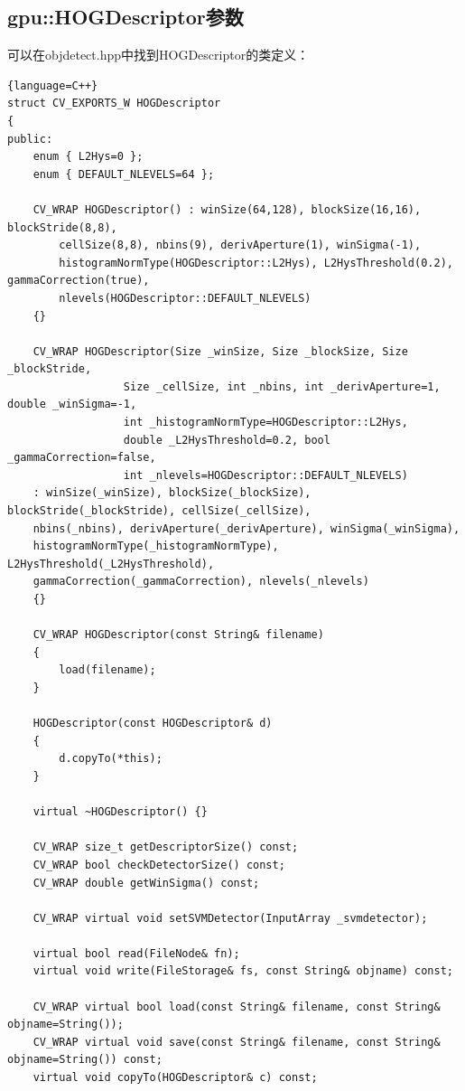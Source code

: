 \documentclass[10pt,technote,onecolumn,twoside]{IEEEtran}
\begin{document}
\subsection{gpu::HOGDescriptor参数}
可以在\textsf{objdetect.hpp}中找到\textsf{HOGDescriptor}的类定义：
\begin{lstlisting}{language=C++}
struct CV_EXPORTS_W HOGDescriptor
{
public:
    enum { L2Hys=0 };
    enum { DEFAULT_NLEVELS=64 };

    CV_WRAP HOGDescriptor() : winSize(64,128), blockSize(16,16), blockStride(8,8),
        cellSize(8,8), nbins(9), derivAperture(1), winSigma(-1),
        histogramNormType(HOGDescriptor::L2Hys), L2HysThreshold(0.2), gammaCorrection(true),
        nlevels(HOGDescriptor::DEFAULT_NLEVELS)
    {}

    CV_WRAP HOGDescriptor(Size _winSize, Size _blockSize, Size _blockStride,
                  Size _cellSize, int _nbins, int _derivAperture=1, double _winSigma=-1,
                  int _histogramNormType=HOGDescriptor::L2Hys,
                  double _L2HysThreshold=0.2, bool _gammaCorrection=false,
                  int _nlevels=HOGDescriptor::DEFAULT_NLEVELS)
    : winSize(_winSize), blockSize(_blockSize), blockStride(_blockStride), cellSize(_cellSize),
    nbins(_nbins), derivAperture(_derivAperture), winSigma(_winSigma),
    histogramNormType(_histogramNormType), L2HysThreshold(_L2HysThreshold),
    gammaCorrection(_gammaCorrection), nlevels(_nlevels)
    {}

    CV_WRAP HOGDescriptor(const String& filename)
    {
        load(filename);
    }

    HOGDescriptor(const HOGDescriptor& d)
    {
        d.copyTo(*this);
    }

    virtual ~HOGDescriptor() {}

    CV_WRAP size_t getDescriptorSize() const;
    CV_WRAP bool checkDetectorSize() const;
    CV_WRAP double getWinSigma() const;

    CV_WRAP virtual void setSVMDetector(InputArray _svmdetector);

    virtual bool read(FileNode& fn);
    virtual void write(FileStorage& fs, const String& objname) const;

    CV_WRAP virtual bool load(const String& filename, const String& objname=String());
    CV_WRAP virtual void save(const String& filename, const String& objname=String()) const;
    virtual void copyTo(HOGDescriptor& c) const;


\end{lstlisting}
\end{document}
